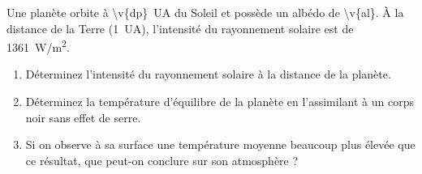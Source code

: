 Une planète orbite à \qty{\v{dp}}{UA} du Soleil et possède un albédo de \num{\v{al}}. À la distance de la Terre (\qty{1}{UA}), l'intensité du rayonnement solaire est de \qty{1361}{W/m^2}.

\begin{enumerate}[label=\alph*)]
    \item Déterminez l'intensité du rayonnement solaire à la distance de la planète.
    \item Déterminez la température d'équilibre de la planète en l'assimilant à un corps noir sans effet de serre.
    \item Si on observe à sa surface une température moyenne beaucoup plus élevée que ce résultat, que peut-on conclure sur son atmosphère ?
\end{enumerate}
